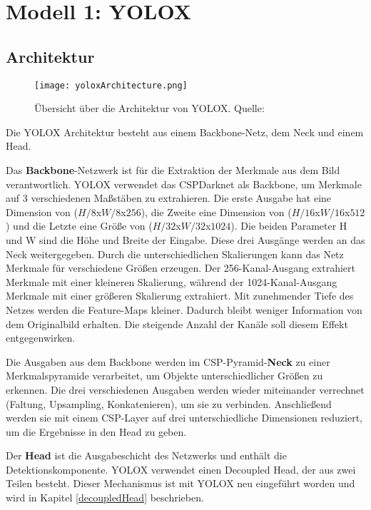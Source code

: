 \chapter{Modell 1: YOLOX}\label{chap:yolox}
\section{Architektur}
\begin{figure}[h]
	\centering
	\texttt{[image: yoloxArchitecture.png]}
	\caption[Übersicht über die Architektur von YOLOX]{Übersicht über die Architektur von YOLOX. Quelle: \cite{yoloArchitecture, yoloxPaper, yoloxGitHubRepo}}
	\label{fig:yoloxArchitecture.png}
\end{figure}

Die YOLOX Architektur besteht aus einem Backbone-Netz, dem Neck und einem Head.

Das \textbf{Backbone}-Netzwerk ist für die Extraktion der Merkmale aus dem Bild verantwortlich. YOLOX verwendet das CSPDarknet als Backbone, um Merkmale auf 3 verschiedenen Maßstäben zu extrahieren. Die erste Ausgabe hat eine Dimension von ($H/8$x$W/8$x$256$), die Zweite eine Dimension von ($H/16$x$W/16$x$512$) und die Letzte eine Größe von ($H/32$x$W/32$x$1024$). Die beiden Parameter H und W sind die Höhe und Breite der Eingabe. Diese drei Ausgänge werden an das Neck weitergegeben. Durch die unterschiedlichen Skalierungen kann das Netz Merkmale für verschiedene Größen erzeugen. Der 256-Kanal-Ausgang extrahiert Merkmale mit einer kleineren Skalierung, während der 1024-Kanal-Ausgang Merkmale mit einer größeren Skalierung extrahiert. Mit zunehmender Tiefe des Netzes werden die Feature-Maps kleiner. Dadurch bleibt weniger Information von dem Originalbild erhalten. Die steigende Anzahl der Kanäle soll diesem Effekt entgegenwirken.

Die Ausgaben aus dem Backbone werden im CSP-Pyramid-\textbf{Neck} zu einer Merkmalspyramide verarbeitet, um Objekte unterschiedlicher Größen zu erkennen. Die drei verschiedenen Ausgaben werden wieder miteinander verrechnet (Faltung, Upsampling, Konkatenieren), um sie zu verbinden. Anschließend werden sie mit einem CSP-Layer auf drei unterschiedliche Dimensionen reduziert, um die Ergebnisse in den Head zu geben.

Der \textbf{Head} ist die Ausgabeschicht des Netzwerks und enthält die Detektionskomponente. YOLOX verwendet einen Decoupled Head, der aus zwei Teilen besteht. Dieser Mechanismus ist mit YOLOX neu eingeführt worden und wird in Kapitel \ref{decoupledHead} beschrieben.



